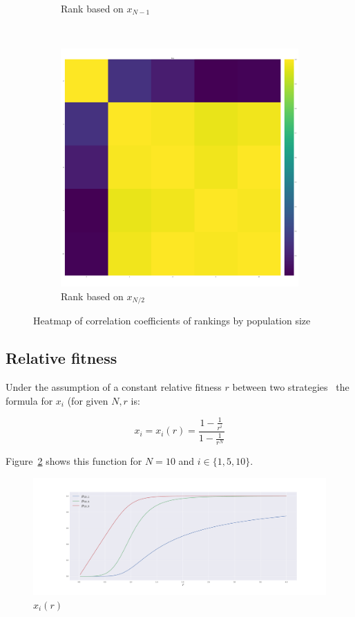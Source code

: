 \documentclass{article}
\begin{document}
\begin{figure}[!htbp]
\begin{subfigure}[t]{.3\textwidth}
        \caption{Rank based on \(x_{N - 1}\)}
    \end{subfigure}
    ~
	\begin{subfigure}[t]{.3\textwidth}
		\centering
		\includegraphics[width=.9\textwidth]{./img/correlation_heatmap_coexist.pdf}
        \caption{Rank based on \(x_{N/2}\)}
    \end{subfigure}
    \caption{Heatmap of correlation coefficients of rankings by population size}
    \label{fig:correlation_coefficients}
\end{figure}

\subsection{Relative fitness}\label{sec:relative_fitness}

Under the assumption of a constant relative fitness \(r\) between two
strategies~\cite{Nowak} the formula for \(x_i\) (for given \(N, r\) is:

\begin{equation}\label{equ:fixation_probability_with_constant_relative_fitness}
    x_i = x_i(r) = \frac{1-\frac{1}{r^{i}}}{1-\frac{1}{r^{N}}}
\end{equation}

Figure~\ref{fig:fixation_v_fitness_illustration} shows this function for
\(N=10\) and \(i\in\{1, 5, 10\}\).

\begin{figure}[!hbtp]
    \centering
    \includegraphics[width=.6\textwidth]{./img/fixation_v_fitness_illustration.pdf}
    \caption{\(x_i(r)\)}
    \label{fig:fixation_v_fitness_illustration}
\end{figure}
\end{document}
